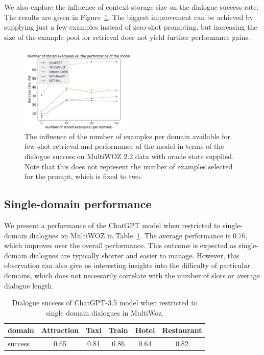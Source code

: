 We also explore the influence of context storage size on the dialogue success rate.
The results are given in Figure~\ref{07:fig:shots}.
The biggest improvement can be achieved by supplying just a few examples instead of zero-shot prompting, but increasing the size of the example pool for retrieval does not yield further performance gains.
\begin{figure}[h]
    \centering
    \includegraphics[width=0.49\textwidth]{images/shots.png}
    \caption{The influence of the number of examples per domain available for few-shot retrieval and performance of the model in terms of the dialogue success on MultiWOZ 2.2 data with oracle state supplied. Note that this does not represent the number of examples selected for the prompt, which is fixed to two.}
    \label{07:fig:shots}
\end{figure}

\subsection{Single-domain performance}
We present a performance of the ChatGPT model when restricted to single-domain dialogues on MultiWOZ in Table~\ref{tab:single-domain}.
The average performance is 0.76, which improves over the overall performance.
This outcome is expected as single-domain dialogues are typically shorter and easier to manage.
However, this observation can also give us interesting insights into the difficulty of particular domains, which does not necessarily correlate with the number of slots or average dialogue length.
\begin{table}[tp]
    \centering
    \begin{tabular}{lccccc}
    \toprule
       domain  &  Attraction & Taxi & Train & Hotel & Restaurant \\ 
    \midrule
        success & 0.65 & 0.81 & 0.86 & 0.64 & 0.82 \\
    \bottomrule
    \end{tabular}
    \caption{Dialogue success of ChatGPT-3.5 model when restricted to single domain dialogues in MultiWoz.}
    \label{tab:single-domain}
\end{table}
